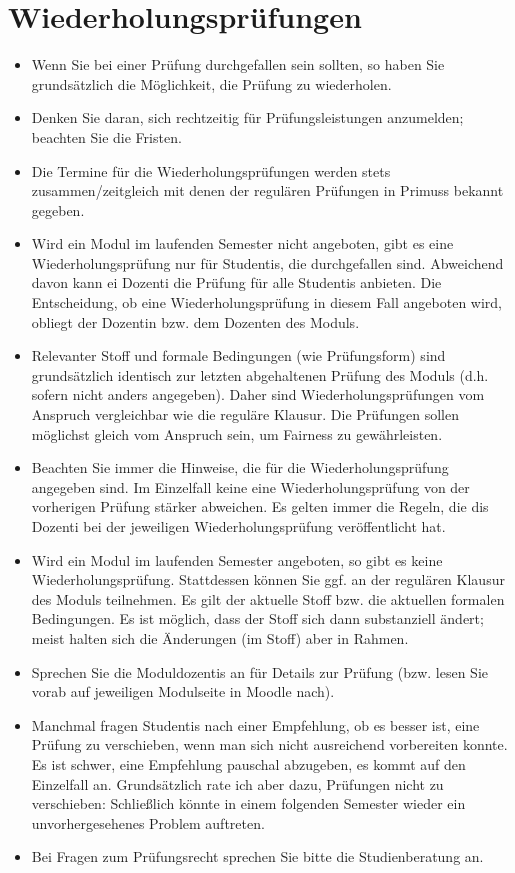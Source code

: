\documentclass[
  a4paper,
  DIV=11]{scrreprt}
\providecommand{\tightlist}{%
  \setlength{\itemsep}{0pt}\setlength{\parskip}{0pt}}\usepackage{longtable,booktabs,array}
\theoremstyle{definition}
\theoremstyle{remark}
\begin{document}
\hypertarget{wiederholungspruxfcfungen}{%
\section{Wiederholungsprüfungen}\label{wiederholungspruxfcfungen}}

\begin{itemize}
\tightlist
\item
  Wenn Sie bei einer Prüfung durchgefallen sein sollten, so haben Sie
  grundsätzlich die Möglichkeit, die Prüfung zu wiederholen.
\item
  Denken Sie daran, sich rechtzeitig für Prüfungsleistungen anzumelden;
  beachten Sie die Fristen.
\item
  Die Termine für die Wiederholungsprüfungen werden stets
  zusammen/zeitgleich mit denen der regulären Prüfungen in Primuss
  bekannt gegeben.
\item
  Wird ein Modul im laufenden Semester nicht angeboten, gibt es eine
  Wiederholungsprüfung nur für Studentis, die durchgefallen sind.
  Abweichend davon kann ei Dozenti die Prüfung für alle Studentis
  anbieten. Die Entscheidung, ob eine Wiederholungsprüfung in diesem
  Fall angeboten wird, obliegt der Dozentin bzw. dem Dozenten des
  Moduls.
\item
  Relevanter Stoff und formale Bedingungen (wie Prüfungsform) sind
  grundsätzlich identisch zur letzten abgehaltenen Prüfung des Moduls
  (d.h. sofern nicht anders angegeben). Daher sind
  Wiederholungsprüfungen vom Anspruch vergleichbar wie die reguläre
  Klausur. Die Prüfungen sollen möglichst gleich vom Anspruch sein, um
  Fairness zu gewährleisten.
\item
  Beachten Sie immer die Hinweise, die für die Wiederholungsprüfung
  angegeben sind. Im Einzelfall keine eine Wiederholungsprüfung von der
  vorherigen Prüfung stärker abweichen. Es gelten immer die Regeln, die
  dis Dozenti bei der jeweiligen Wiederholungsprüfung veröffentlicht
  hat.
\item
  Wird ein Modul im laufenden Semester angeboten, so gibt es keine
  Wiederholungsprüfung. Stattdessen können Sie ggf. an der regulären
  Klausur des Moduls teilnehmen. Es gilt der aktuelle Stoff bzw. die
  aktuellen formalen Bedingungen. Es ist möglich, dass der Stoff sich
  dann substanziell ändert; meist halten sich die Änderungen (im Stoff)
  aber in Rahmen.
\item
  Sprechen Sie die Moduldozentis an für Details zur Prüfung (bzw. lesen
  Sie vorab auf jeweiligen Modulseite in Moodle nach).
\item
  Manchmal fragen Studentis nach einer Empfehlung, ob es besser ist,
  eine Prüfung zu verschieben, wenn man sich nicht ausreichend
  vorbereiten konnte. Es ist schwer, eine Empfehlung pauschal abzugeben,
  es kommt auf den Einzelfall an. Grundsätzlich rate ich aber dazu,
  Prüfungen nicht zu verschieben: Schließlich könnte in einem folgenden
  Semester wieder ein unvorhergesehenes Problem auftreten.
\item
  Bei Fragen zum Prüfungsrecht sprechen Sie bitte die Studienberatung
  an.
\end{itemize}
\end{document}
